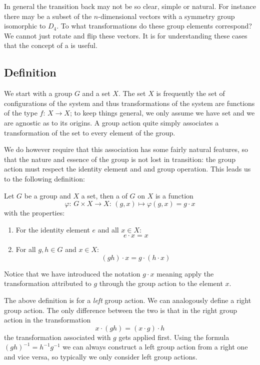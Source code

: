 In general the transition back may not be so clear, simple or natural. For instance there may be a subset of the $n$-dimensional vectors with a symmetry group isomorphic to $D_4$. To what transformations do these group elements correspond? We cannot just rotate and flip these vectors. It is for understanding these cases that the concept of a  is useful.

\subsection{Definition}
We start with a group $G$ and a set $X$. The set $X$ is frequently the set of configurations of the system and thus transformations of the system are functions of the type $f:\,X\to X$; to keep things general, we only assume we have set and we are agnostic as to its origins.
A group action quite simply associates a transformation of the set to every element of the group.

We do however require that this association has some fairly natural features, so that the nature and essence of the group is not lost in transition: the group action must respect the identity element and and group operation. This leads us to the following definition:
\begin{definition}
Let $G$ be a group and $X$ a set, then a  of $G$ on $X$ is a function
\[ \varphi: \, G\times X \to X: \, (g,x)\mapsto \varphi(g,x) = g\cdot x \]
with the properties:
\begin{enumerate}
\item For the identity element $e$ and all $x\in X$: 
\[e\cdot x = x \]
\item For all $g,h \in G$ and $x\in X$:
\[ (gh)\cdot x = g\cdot (h\cdot x) \]
\end{enumerate}
Notice that we have introduced the notation $g\cdot x$ meaning apply the transformation attributed to $g$ through the group action to the element $x$.
\end{definition}

The above definition is for a \textit{left} group action. We can analogously define a right group action. The only difference between the two is that in the right group action in the transformation
\[ x \cdot (gh) = (x\cdot g)\cdot h \]
the transformation associated with $g$ gets applied first. Using the formula $(gh)^{-1} = h^{-1}g^{-1}$ we can always construct a left group action from a right one and vice versa, so typically we only consider left group actions.

